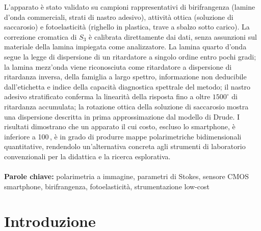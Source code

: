 \documentclass{Configuration_Files/PoliMi3i_thesis}
\newcommand{\REVstart}[1]{\color{#1}}
\newcommand{\REVend}[1]{\color{black}}
\begin{document}
L'apparato è stato validato su campioni rappresentativi di birifrangenza (lamine d'onda commerciali, strati di nastro adesivo), attività ottica (soluzione di saccarosio) e fotoelasticità (righello in plastica, trave a sbalzo sotto carico). La correzione cromatica di $S_3$ è calibrata direttamente dai dati, senza assunzioni sul materiale della lamina impiegata come analizzatore. La lamina quarto d'onda segue la legge di dispersione di un ritardatore a singolo ordine entro pochi gradi; la lamina mezz'onda viene riconosciuta come ritardatore a dispersione di ritardanza inversa, della famiglia a largo spettro, informazione non deducibile dall'etichetta e indice della capacità diagnostica spettrale del metodo; il nastro adesivo stratificato conferma la linearità della risposta fino a oltre $1500^\circ$ di ritardanza accumulata; la rotazione ottica della soluzione di saccarosio mostra una dispersione descritta in prima approssimazione dal modello di Drude. I risultati dimostrano che un apparato il cui costo, escluso lo smartphone, è inferiore a 100\,\texteuro, è in grado di produrre mappe polarimetriche bidimensionali quantitative, rendendolo un'alternativa concreta agli strumenti di laboratorio convenzionali per la didattica e la ricerca esplorativa.
\\
\\
\textbf{Parole chiave:} polarimetria a immagine, parametri di Stokes, sensore CMOS smartphone, birifrangenza, fotoelasticit\`a, strumentazione low-cost


\thispagestyle{empty}
\tableofcontents
\thispagestyle{empty}
\cleardoublepage


\mainmatter %


\chapter{Introduzione}
\label{ch:introduzione}
\REVstart{revIntro}

\REVend{revIntro}
\end{document}
